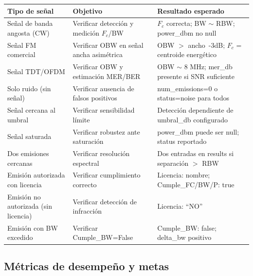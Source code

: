 \begin{tabular}{p{5cm}p{5cm}p{5cm}}
\textbf{Tipo de señal} & \textbf{Objetivo} & \textbf{Resultado esperado} \\
\hline
Señal de banda angosta (CW) & Verificar detección y medición $F_c$/BW & $F_c$ correcta; BW $\sim$ RBW; power\_dbm no null \\
Señal FM comercial & Verificar OBW en señal ancha asimétrica & OBW $>$ ancho \,-3dB; $F_c$ = centroide energético \\
Señal TDT/OFDM & Verificar OBW y estimación MER/BER & OBW $\sim$ 8 MHz; mer\_db presente si SNR suficiente \\
Solo ruido (sin señal) & Verificar ausencia de falsos positivos & num\_emissions=0 o status=noise para todos \\
Señal cercana al umbral & Verificar sensibilidad límite & Detección dependiente de umbral\_db configurado \\
Señal saturada & Verificar robustez ante saturación & power\_dbm puede ser null; status reportado \\
Dos emisiones cercanas & Verificar resolución espectral & Dos entradas en results si separación $>$ RBW \\
Emisión autorizada con licencia & Verificar cumplimiento correcto & Licencia: nombre; Cumple\_FC/BW/P: true \\
Emisión no autorizada (sin licencia) & Verificar detección de infracción & Licencia: \enquote{NO} \\
Emisión con BW excedido & Verificar Cumple\_BW=False & Cumple\_BW: false; delta\_bw positivo \\
\end{tabular}

\subsection{Métricas de desempeño y metas}

